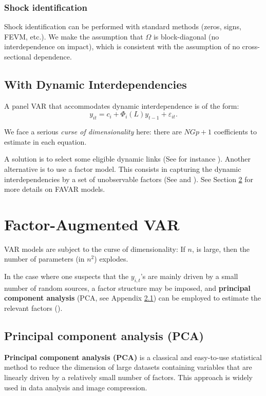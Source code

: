 \documentclass[
  12pt,
]{book}
\theoremstyle{definition}
\theoremstyle{definition}
\theoremstyle{definition}
\theoremstyle{definition}
\theoremstyle{remark}
\begin{document}
\subsection{Shock identification}\label{shock-identification}

Shock identification can be performed with standard methods (zeros, signs, FEVM, etc.). We make the assumption that \(\Omega\) is block-diagonal (no interdependence on impact), which is consistent with the assumption of no cross-sectional dependence.

\section{With Dynamic Interdependencies}\label{with-dynamic-interdependencies}

A panel VAR that accommodates dynamic interdependence is of the form:
\[ y_{it}=c_i+\Phi_i(L)
y_{t-1}+\varepsilon_{it}.\]

We face a serious \emph{curse of dimensionality} here: there are \(NGp+1\) coefficients to estimate in
each equation.

A solution is to select some eligible dynamic links (See for instance \citet{DelNegro_Schorfheide_2010}). Another alternative is to use a factor model. This consists in capturing the dynamic interdependencies by a set of unobservable factors (See \citet{Canova_Cicarelli_2004} and \citet{Canova_Cicarelli_2009}). See Section \ref{FAVAR} for more details on FAVAR models.

\chapter{Factor-Augmented VAR}\label{FAVAR}

VAR models are subject to the curse of dimensionality: If \(n\), is large, then the number of parameters (in \(n^2\)) explodes.

In the case where one suspects that the \(y_{i,t}\)'s are mainly driven by a small number of random sources, a factor structure may be imposed, and \textbf{principal component analysis} (PCA, see Appendix \ref{PCAapp}) can be employed to estimate the relevant factors (\citet{Bernanke_Boivin_Eliasz_2005}).

\section{Principal component analysis (PCA)}\label{PCAapp}

\textbf{Principal component analysis (PCA)} is a classical and easy-to-use statistical method to reduce the dimension of large datasets containing variables that are linearly driven by a relatively small number of factors. This approach is widely used in data analysis and image compression.
\end{document}
